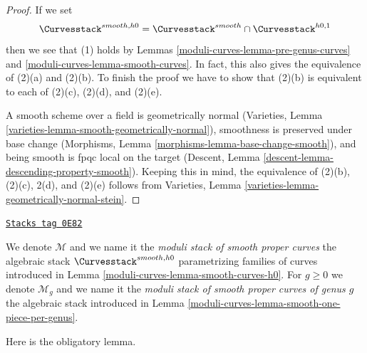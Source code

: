 \begin{proof}
If we set
$$
\Curvesstack^{smooth, h0} = \Curvesstack^{smooth} \cap
\Curvesstack^{h0, 1}
$$
then we see that (1) holds by
Lemmas \ref{moduli-curves-lemma-pre-genus-curves} and \ref{moduli-curves-lemma-smooth-curves}.
In fact, this also gives the equivalence of (2)(a) and (2)(b).
To finish the proof we have to show that
(2)(b) is equivalent to each of (2)(c), (2)(d), and (2)(e).

\medskip\noindent
A smooth scheme over a field is geometrically normal
(Varieties, Lemma \ref{varieties-lemma-smooth-geometrically-normal}),
smoothness is preserved under base change
(Morphisms, Lemma \ref{morphisms-lemma-base-change-smooth}), and
being smooth is fpqc local on the target
(Descent, Lemma \ref{descent-lemma-descending-property-smooth}).
Keeping this in mind, the equivalence of (2)(b), (2)(c), 2(d), and (2)(e)
follows from Varieties, Lemma \ref{varieties-lemma-geometrically-normal-stein}.
\end{proof}

\begin{definition}
\label{moduli-curves-definition-deligne-mumford-smooth}
\href{https://stacks.math.columbia.edu/tag/0E82}{\texttt{Stacks tag 0E82}}

\begin{reference}
\cite{DM}
\end{reference}
We denote $\mathcal{M}$ and we name it the
{\it moduli stack of smooth proper curves}
the algebraic stack
$\Curvesstack^{smooth, h0}$ parametrizing families of curves
introduced in Lemma \ref{moduli-curves-lemma-smooth-curves-h0}.
For $g \geq 0$ we denote $\mathcal{M}_g$ and we name it the
{\it moduli stack of smooth proper curves of genus $g$}
the algebraic stack introduced in
Lemma \ref{moduli-curves-lemma-smooth-one-piece-per-genus}.
\end{definition}

Here is the obligatory lemma.

